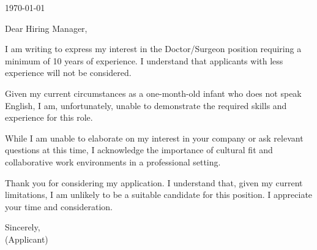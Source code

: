\documentclass[letterpaper,11pt]{article}
\begin{document}
\today \\
\vspace{20pt}

Dear Hiring Manager, \\
\vspace{10pt}

I am writing to express my interest in the Doctor/Surgeon position requiring a minimum of 10 years of experience. I understand that applicants with less experience will not be considered.
\vspace{10pt}

Given my current circumstances as a one-month-old infant who does not speak English, I am, unfortunately, unable to demonstrate the required skills and experience for this role.
\vspace{10pt}

While I am unable to elaborate on my interest in your company or ask relevant questions at this time, I acknowledge the importance of cultural fit and collaborative work environments in a professional setting.
\vspace{10pt}

Thank you for considering my application. I understand that, given my current limitations, I am unlikely to be a suitable candidate for this position. I appreciate your time and consideration.
\vspace{20pt}

Sincerely, \\
\vspace{40pt} %
(Applicant)

\end{document}
